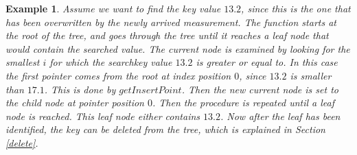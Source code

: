 \documentclass[abstracton,12pt]{scrreprt}
\newtheorem{example}{Example}
\begin{document}
\begin{example}
	Assume we want to find the key value $13.2$, since this is the one that has been overwritten by the newly arrived measurement. The function starts at the root of the tree, and goes through the tree until it reaches a leaf node that would contain the searched value. The current node is examined by looking for the smallest $i$ for which the searchkey value $13.2$ is greater or equal to. In this case the first pointer comes from the root at index position $0$, since $13.2$ is smaller than $17.1$. This is done by $getInsertPoint$. Then the new current node is set to the child node at pointer position $0$. Then the procedure is repeated until a leaf node is reached. This leaf node either contains $13.2$. Now after the leaf has been identified, the key can be deleted from the tree, which is explained in Section \ref{delete}.
\end{example} 
\end{document}
